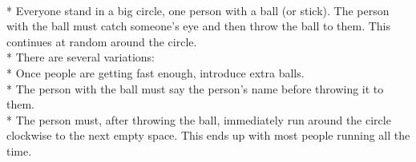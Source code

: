 \begin{minipage}{\textwidth}
\\*
Everyone stand in a big circle, one person with a ball (or stick). The person with the ball must catch someone's eye and then throw the ball to them.  This continues at random around the circle.\\*
There are several variations:\\*
Once people are getting fast enough, introduce extra balls.\\*
The person with the ball must say the person's name before throwing it to them.\\*
The person must, after throwing the ball, immediately run around the circle clockwise to the next empty space.  This ends up with most people running all the time.
\end{minipage}    \vfill
